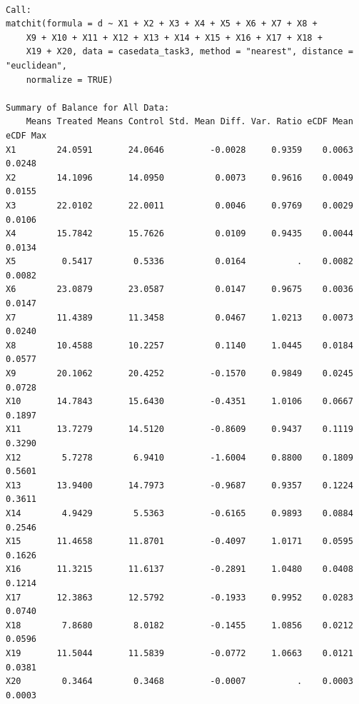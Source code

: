 \documentclass[
  letterpaper,
  DIV=11,
  numbers=noendperiod]{scrartcl}
\begin{document}
\begin{verbatim}

Call:
matchit(formula = d ~ X1 + X2 + X3 + X4 + X5 + X6 + X7 + X8 + 
    X9 + X10 + X11 + X12 + X13 + X14 + X15 + X16 + X17 + X18 + 
    X19 + X20, data = casedata_task3, method = "nearest", distance = "euclidean", 
    normalize = TRUE)

Summary of Balance for All Data:
    Means Treated Means Control Std. Mean Diff. Var. Ratio eCDF Mean eCDF Max
X1        24.0591       24.0646         -0.0028     0.9359    0.0063   0.0248
X2        14.1096       14.0950          0.0073     0.9616    0.0049   0.0155
X3        22.0102       22.0011          0.0046     0.9769    0.0029   0.0106
X4        15.7842       15.7626          0.0109     0.9435    0.0044   0.0134
X5         0.5417        0.5336          0.0164          .    0.0082   0.0082
X6        23.0879       23.0587          0.0147     0.9675    0.0036   0.0147
X7        11.4389       11.3458          0.0467     1.0213    0.0073   0.0240
X8        10.4588       10.2257          0.1140     1.0445    0.0184   0.0577
X9        20.1062       20.4252         -0.1570     0.9849    0.0245   0.0728
X10       14.7843       15.6430         -0.4351     1.0106    0.0667   0.1897
X11       13.7279       14.5120         -0.8609     0.9437    0.1119   0.3290
X12        5.7278        6.9410         -1.6004     0.8800    0.1809   0.5601
X13       13.9400       14.7973         -0.9687     0.9357    0.1224   0.3611
X14        4.9429        5.5363         -0.6165     0.9893    0.0884   0.2546
X15       11.4658       11.8701         -0.4097     1.0171    0.0595   0.1626
X16       11.3215       11.6137         -0.2891     1.0480    0.0408   0.1214
X17       12.3863       12.5792         -0.1933     0.9952    0.0283   0.0740
X18        7.8680        8.0182         -0.1455     1.0856    0.0212   0.0596
X19       11.5044       11.5839         -0.0772     1.0663    0.0121   0.0381
X20        0.3464        0.3468         -0.0007          .    0.0003   0.0003


\end{verbatim}
\end{document}
